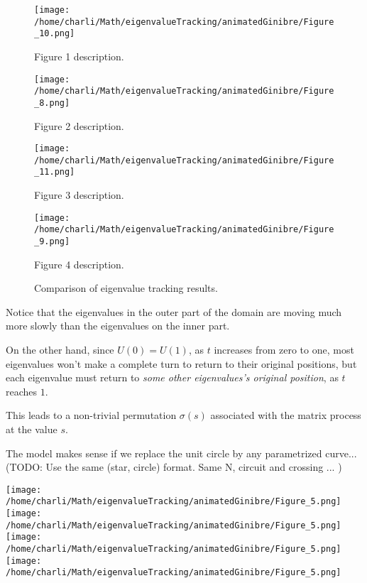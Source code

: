 \documentclass{article}
\begin{document}
	 \begin{figure}[htbp]
		\centering
		\begin{minipage}[b]{0.48\textwidth}
			\centering
			\texttt{[image: /home/charli/Math/eigenvalueTracking/animatedGinibre/Figure\_10.png]} 
			\caption{Figure 1 description.}
		\end{minipage}
		\hfill
		\begin{minipage}[b]{0.48\textwidth}
			\centering
			\texttt{[image: /home/charli/Math/eigenvalueTracking/animatedGinibre/Figure\_8.png]} 
			\caption{Figure 2 description.}
		\end{minipage}
	
		\vspace{0.5cm}
		\begin{minipage}[b]{0.48\textwidth}
			\centering
			\texttt{[image: /home/charli/Math/eigenvalueTracking/animatedGinibre/Figure\_11.png]} 
			\caption{Figure 3 description.}
		\end{minipage}
		\hfill
		\begin{minipage}[b]{0.48\textwidth}
			\centering
			\texttt{[image: /home/charli/Math/eigenvalueTracking/animatedGinibre/Figure\_9.png]}
			\caption{Figure 4 description.}
		\end{minipage}
	
		\caption{Comparison of eigenvalue tracking results.}
		\label{fig:comparison_2x2}
	\end{figure}

	Notice that the eigenvalues in the outer part of the domain are moving much more slowly 
	than the eigenvalues on the inner part.

	On the other hand, since $U(0) = U(1)$, as $t$ increases from zero to one, 
	most eigenvalues won't make a complete turn to return to their original positions, 
	but each eigenvalue must return to \emph{some other eigenvalues's original position}, as $t$ reaches $1$. 

	This leads to a non-trivial permutation $\sigma(s)$ 
	associated with the matrix process at the value $s$.

	The model makes sense if we replace the  unit circle by any parametrized curve... 
	(TODO: Use the same (star, circle) format. Same N, circuit and crossing ... )

	\texttt{[image: /home/charli/Math/eigenvalueTracking/animatedGinibre/Figure\_5.png]} 
	\texttt{[image: /home/charli/Math/eigenvalueTracking/animatedGinibre/Figure\_5.png]} 
	\texttt{[image: /home/charli/Math/eigenvalueTracking/animatedGinibre/Figure\_5.png]} 
	\texttt{[image: /home/charli/Math/eigenvalueTracking/animatedGinibre/Figure\_5.png]}
	
\end{document}
